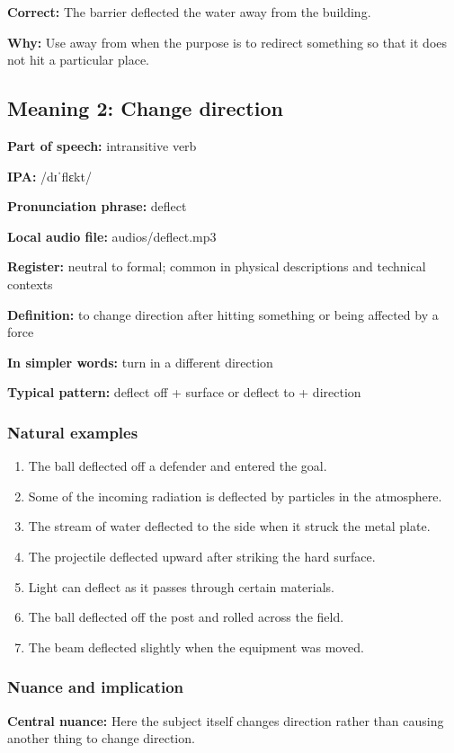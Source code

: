 \documentclass[11pt]{article}
\begin{document}
\textbf{Correct:} The barrier deflected the water away from the building.

\textbf{Why:} Use away from when the purpose is to redirect something so that it does not hit a particular place.

\subsection{Meaning 2: Change direction}
\textbf{Part of speech:} intransitive verb

\textbf{IPA:} /dɪˈflɛkt/

\textbf{Pronunciation phrase:} deflect

\textbf{Local audio file:} audios/deflect.mp3

\textbf{Register:} neutral to formal; common in physical descriptions and technical contexts

\textbf{Definition:} to change direction after hitting something or being affected by a force

\textbf{In simpler words:} turn in a different direction

\textbf{Typical pattern:} deflect off + surface or deflect to + direction

\subsubsection{Natural examples}
\begin{enumerate}
  \item The ball deflected off a defender and entered the goal.
  \item Some of the incoming radiation is deflected by particles in the atmosphere.
  \item The stream of water deflected to the side when it struck the metal plate.
  \item The projectile deflected upward after striking the hard surface.
  \item Light can deflect as it passes through certain materials.
  \item The ball deflected off the post and rolled across the field.
  \item The beam deflected slightly when the equipment was moved.
\end{enumerate}

\subsubsection{Nuance and implication}
\textbf{Central nuance:} Here the subject itself changes direction rather than causing another thing to change direction.
\end{document}
